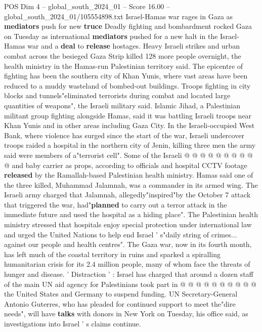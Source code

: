 \begin{textsample}{POS Dim 4 – global\_south\_2024\_01 – Score 16.00 – global\_south\_2024\_01/105554898.txt}  \label{ex:f4_pos_373}
Israel-Hamas war rages in Gaza as \textbf{mediators} push for new \textbf{truce} Deadly fighting and bombardment rocked Gaza on Tuesday as international \textbf{mediators} pushed for a new halt in the Israel-Hamas war and a \textbf{deal} to \textbf{release} hostages.
Heavy Israeli strikes and urban combat across the besieged Gaza Strip killed 128 more people overnight, the health ministry in the Hamas-run Palestinian territory said.
The epicentre of fighting has been the southern city of Khan Yunis, where vast areas have been reduced to a muddy wasteland of bombed-out buildings.
Troops fighting in city blocks and tunnels"eliminated terrorists during combat and located large quantities of weapons", the Israeli military said.
Islamic Jihad, a Palestinian militant group fighting alongside Hamas, said it was battling Israeli troops near Khan Yunis and in other areas including Gaza City.
In the Israeli-occupied West Bank, where violence has surged since the start of the war, Israeli undercover troops raided a hospital in the northern city of Jenin, killing three men the army said were members of a"terrorist cell".
Some of the Israeli @ @ @ @ @ @ @ @ @ @ and baby carrier as props, according to officials and hospital CCTV footage \textbf{released} by the Ramallah-based Palestinian health ministry.
Hamas said one of the three killed, Muhammad Jalamnah, was a commander in its armed wing.
The Israeli army charged that Jalamnah, allegedly"inspired"by the October 7 attack that triggered the war, had"\textbf{planned} to carry out a terror attack in the immediate future and used the hospital as a hiding place".
The Palestinian health ministry stressed that hospitals enjoy special protection under international law and urged the United Nations to help end Israel ' s"daily string of crimes... against our people and health centres".
The Gaza war, now in its fourth month, has left much of the coastal territory in ruins and sparked a spiralling humanitarian crisis for its 2.4 million people, many of whom face the threats of hunger and disease. ' Distraction ' : Israel has charged that around a dozen staff of the main UN aid agency for Palestinians took part in @ @ @ @ @ @ @ @ @ @ the United States and Germany to suspend funding.
UN Secretary-General Antonio Guterres, who has pleaded for continued support to meet the"dire needs", will have \textbf{talks} with donors in New York on Tuesday, his office said, as investigations into Israel ' s claims continue.

\end{textsample}
